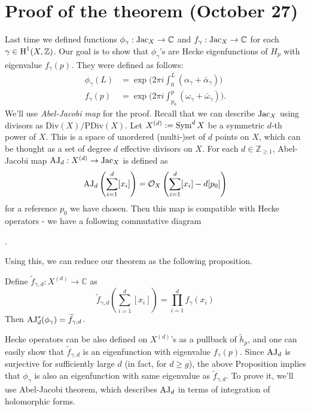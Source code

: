 \newpage
\section{Proof of the theorem (October 27)}

Last time we defined functions $\phi_\gamma : \operatorname{\mathrm{Jac}}_X \to \mathbb{C}$ and $f_\gamma : \operatorname{\mathrm{Jac}}_X \to \mathbb{C}$
for each $\gamma \in \operatorname{\mathrm{H}}^1(X, \mathbb{Z})$.
Our goal is to show that $\phi_\gamma$'s are Hecke eigenfunctions of $H_p$ with eigenvalue $f_\gamma(p)$.
They were defined as follows:
\begin{align*}
    \phi_\gamma(L) &= \exp \bigg(2 \pi i \int_0^{L} (\alpha_\gamma + \bar\alpha_\gamma) \bigg) \\
    f_\gamma(p) &= \exp \bigg(2 \pi i \int_{p_0}^{p} (\omega_\gamma + \bar\omega_\gamma) \bigg).
\end{align*}
We'll use \emph{Abel-Jacobi map} for the proof. 
Recall that we can describe $\operatorname{\mathrm{Jac}}_X$ using divisors as $\mathrm{Div}(X) / \mathrm{PDiv}(X)$.
Let $X^{(d)}:= \operatorname{\mathrm{Sym}}^d X$ be a symmetric $d$-th power of $X$.
This is a space of unordered (multi-)set of $d$ points on $X$, which can be thought as a set of degree $d$ effective divisors on $X$.
For each $d \in \mathbb{Z}_{\geq 1}$, Abel-Jacobi map $\operatorname{\mathrm{AJ}}_d: X^{(d)} \to \operatorname{\mathrm{Jac}}_X$ is defined as
\[
    \operatorname{\mathrm{AJ}}_d\left(\sum_{i=1}^{d} [x_i]\right) = \mathcal{O}_X\left(\sum_{i=1}^{d} [x_i] - d[p_0]\right)
\]
for a reference $p_0$ we have chosen.
Then this map is compatible with Hecke operators - we have a following commutative diagram
\begin{center}
    .
\end{center}
Using this, we can reduce our theorem as the following proposition.

\begin{proposition}
    Define $\widetilde{f}_{\gamma, d}: X^{(d)} \to \mathbb{C}$ as
    \[
    \widetilde{f}_{\gamma, d}\left(\sum_{i=1}^{d} [x_i]\right) = \prod_{i=1}^{d} f_{\gamma}(x_i)
    \]
    Then $\operatorname{\mathrm{AJ}}_{d}^{*}(\phi_\gamma) = \widetilde{f}_{\gamma,d}$.
\end{proposition}

Hecke operators can be also defined on $X^{(d)}$'s as a pullback of $\widetilde{h}_p$, and one can 
easily show that $\widetilde{f}_{\gamma, d}$ is an eigenfunction with eigenvalue $f_{\gamma}(p)$.
Since $\operatorname{\mathrm{AJ}}_d$ is surjective for sufficiently large $d$ (in fact, for $d \geq g$), the above Proposition implies that
$\phi_\gamma$ is also an eigenfunction with same eigenvalue as $\widetilde{f}_{\gamma, d}$.
To prove it, we'll use Abel-Jacobi theorem, which describes $\operatorname{\mathrm{AJ}}_d$ in terms of integration of holomorphic forms.


